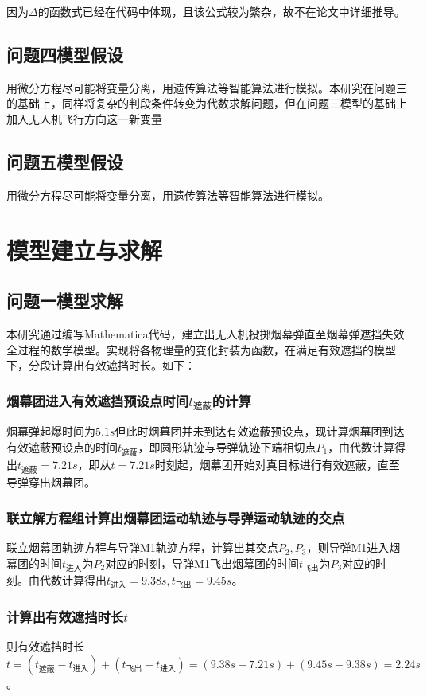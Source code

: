 \documentclass{article}
\begin{document}
因为$\Delta$的函数式已经在代码中体现，且该公式较为繁杂，故不在论文中详细推导。
\subsection{问题四模型假设}
用微分方程尽可能将变量分离，用遗传算法等智能算法进行模拟。本研究在问题三的基础上，同样将复杂的判段条件转变为代数求解问题，但在问题三模型的基础上加入无人机飞行方向这一新变量

\subsection{问题五模型假设}
用微分方程尽可能将变量分离，用遗传算法等智能算法进行模拟。

\section{模型建立与求解}

\subsection{问题一模型求解}

本研究通过编写Mathematica代码，建立出无人机投掷烟幕弹直至烟幕弹遮挡失效全过程的数学模型。实现将各物理量的变化封装为函数，在满足有效遮挡的模型下，分段计算出有效遮挡时长。如下：

\subsubsection{烟幕团进入有效遮挡预设点时间$t_\text{遮蔽}$的计算}
烟幕弹起爆时间为$5.1s$但此时烟幕团并未到达有效遮蔽预设点，现计算烟幕团到达有效遮蔽预设点的时间$t_\text{遮蔽}$，即圆形轨迹与导弹轨迹下端相切点$P_1$，由代数计算得出$t_\text{遮蔽} = 7.21s$，即从$t=7.21s$时刻起，烟幕团开始对真目标进行有效遮蔽，直至导弹穿出烟幕团。

\subsubsection{联立解方程组计算出烟幕团运动轨迹与导弹运动轨迹的交点}
联立烟幕团轨迹方程与导弹M1轨迹方程，计算出其交点$P_2,P_3$，则导弹M1进入烟幕团的时间$t_{\text{进入}}$为$P_2$对应的时刻，导弹M1飞出烟幕团的时间$t_{\text{飞出}}$为$P_3$对应的时刻。由代数计算得出$t_{\text{进入}} = 9.38s,t_{\text{飞出}} = 9.45s$。

\subsubsection{计算出有效遮挡时长$t$}
则有效遮挡时长$t =(t_\text{遮蔽}- t_\text{进入}) + (t_{\text{飞出}} - t_{\text{进入}}) = (9.38s - 7.21s) + (9.45s - 9.38s) = 2.24s$。
\end{document}

